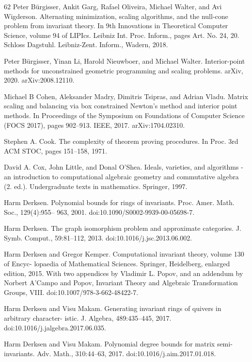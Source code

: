\begin{thebibliography}{62}
Peter Bürgisser, Ankit Garg, Rafael Oliveira, Michael Walter, and Avi Wigderson. Alternating minimization, scaling algorithms, and the null-cone problem from invariant theory. In 9th Innovations in Theoretical Computer Science, volume 94 of LIPIcs. Leibniz Int. Proc. Inform., pages Art. No. 24, 20. Schloss Dagstuhl. Leibniz-Zent. Inform., Wadern, 2018.

Peter Bürgisser, Yinan Li, Harold Nieuwboer, and Michael Walter. Interior-point methods for unconstrained geometric programming and scaling problems. arXiv, 2020. arXiv:2008.12110.

Michael B Cohen, Aleksander Madry, Dimitris Tsipras, and Adrian Vladu. Matrix scaling and balancing via box constrained Newton’s method and interior point methods. In Proceedings of the Symposium on Foundations of Computer Science (FOCS 2017), pages 902–913. IEEE, 2017. arXiv:1704.02310.

Stephen A. Cook. The complexity of theorem proving procedures. In Proc. 3rd ACM STOC, pages 151–158, 1971.

David A. Cox, John Little, and Donal O’Shea. Ideals, varieties, and algorithms - an introduction to computational algebraic geometry and commutative algebra (2. ed.). Undergraduate texts in mathematics. Springer, 1997.

Harm Derksen. Polynomial bounds for rings of invariants. Proc. Amer. Math. Soc., 129(4):955– 963, 2001. doi:10.1090/S0002-9939-00-05698-7.

Harm Derksen. The graph isomorphism problem and approximate categories. J. Symb. Comput., 59:81–112, 2013. doi:10.1016/j.jsc.2013.06.002.

Harm Derksen and Gregor Kemper. Computational invariant theory, volume 130 of Encyc- lopaedia of Mathematical Sciences. Springer, Heidelberg, enlarged edition, 2015. With two appendices by Vladimir L. Popov, and an addendum by Norbert A’Campo and Popov, Invariant Theory and Algebraic Transformation Groups, VIII. doi:10.1007/978-3-662-48422-7.

Harm Derksen and Visu Makam. Generating invariant rings of quivers in arbitrary character- istic. J. Algebra, 489:435–445, 2017. doi:10.1016/j.jalgebra.2017.06.035.

Harm Derksen and Visu Makam. Polynomial degree bounds for matrix semi-invariants. Adv. Math., 310:44–63, 2017. doi:10.1016/j.aim.2017.01.018.


\end{thebibliography}
